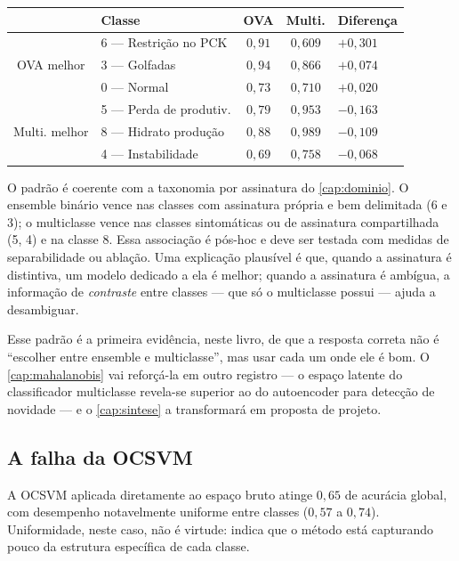 \begin{center}
\small
\begin{tabular}{clcc l}
\toprule
& \textbf{Classe} & \textbf{OVA} & \textbf{Multi.} & \textbf{Diferença} \\
\midrule
\multirow{3}{*}{OVA melhor}
& 6 --- Restrição no PCK   & $0{,}91$ & $0{,}609$ & $+0{,}301$ \\
& 3 --- Golfadas           & $0{,}94$ & $0{,}866$ & $+0{,}074$ \\
& 0 --- Normal             & $0{,}73$ & $0{,}710$ & $+0{,}020$ \\
\midrule
\multirow{3}{*}{Multi. melhor}
& 5 --- Perda de produtiv. & $0{,}79$ & $0{,}953$ & $-0{,}163$ \\
& 8 --- Hidrato produção   & $0{,}88$ & $0{,}989$ & $-0{,}109$ \\
& 4 --- Instabilidade      & $0{,}69$ & $0{,}758$ & $-0{,}068$ \\
\bottomrule
\end{tabular}
\end{center}

O padrão é coerente com a taxonomia por assinatura do \cref{cap:dominio}. O ensemble
binário vence nas classes com assinatura própria e bem delimitada (6 e 3); o
multiclasse vence nas classes sintomáticas ou de assinatura compartilhada (5, 4) e na
classe 8. Essa associação é pós-hoc e deve ser testada com medidas de separabilidade ou
ablação. Uma explicação plausível é que, quando a assinatura é distintiva, um modelo dedicado a
ela é melhor; quando a assinatura é ambígua, a informação de \emph{contraste} entre
classes --- que só o multiclasse possui --- ajuda a desambiguar.

\begin{destaque}
Esse padrão é a primeira evidência, neste livro, de que a resposta correta não é
``escolher entre ensemble e multiclasse'', mas usar cada um onde ele é bom. O
\cref{cap:mahalanobis} vai reforçá-la em outro registro --- o espaço latente do
classificador multiclasse revela-se superior ao do autoencoder para detecção de
novidade --- e o \cref{cap:sintese} a transformará em proposta de projeto.
\end{destaque}

\subsection{A falha da OCSVM}

A OCSVM aplicada diretamente ao espaço bruto atinge $0{,}65$ de acurácia global, com
desempenho notavelmente uniforme entre classes ($0{,}57$ a $0{,}74$). Uniformidade,
neste caso, não é virtude: indica que o método está capturando pouco da estrutura
específica de cada classe.

